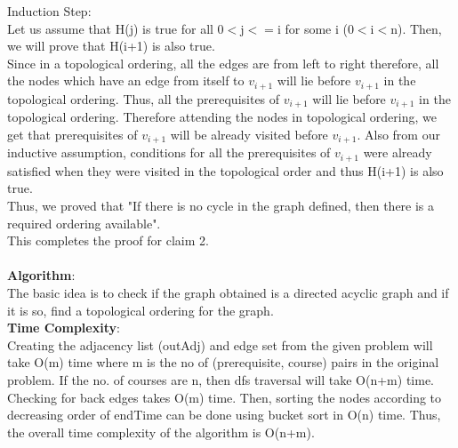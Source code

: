 \documentclass{article}
\begin{document}
Induction Step:\\
Let us assume that H(j) is true for all 0$<$j$<=$i for some i (0$<$i$<$n). Then, we will prove that H(i+1) is also true.\\
Since in a topological ordering, all the edges are from left to right therefore, all the nodes which have an edge from itself to $v_{i+1}$ will lie before $v_{i+1}$ in the topological ordering. Thus, all the prerequisites of $v_{i+1}$ will lie before $v_{i+1}$ in the topological ordering. Therefore attending the nodes in topological ordering, we get that prerequisites of $v_{i+1}$ will be already visited before $v_{i+1}$. Also from our inductive assumption, conditions for all the prerequisites of $v_{i+1}$ were already satisfied when they were visited in the topological order and thus H(i+1) is also true.
\\
Thus, we proved that "If there is no cycle in the graph defined, then there is a required ordering available".
\\
This completes the proof for claim 2.\\
\\
\textbf{Algorithm}:\\
The basic idea is to check if the graph obtained is a directed acyclic graph and if it is so, find a topological ordering for the graph.\\


\textbf{Time Complexity}:\\
Creating the adjacency list (outAdj) and edge set from the given problem will take O(m) time where m is the no of (prerequisite, course) pairs in the original problem. If the no. of courses are n, then dfs traversal will take O(n+m) time. Checking for back edges takes O(m) time. Then, sorting the nodes according to decreasing order of endTime can be done using bucket sort in O(n) time. Thus, the overall time complexity of the algorithm is O(n+m).

\newpage
\end{document}
